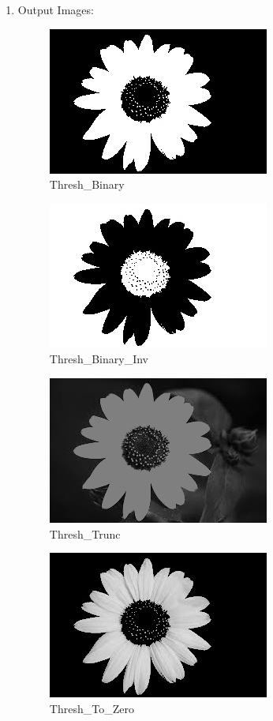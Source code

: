 \documentclass[]{article}
\begin{document}
\begin{enumerate}
\item Output Images:
	\begin{figure}[h]
		\centering
	  	\includegraphics{Threshbinary.jpg}
	  	\caption{Thresh\_Binary}
	\end{figure}

	\begin{figure}[b]
	  	\centering
	  	\includegraphics{ThreshBinaryInv.jpg}
	  	\caption{Thresh\_Binary\_Inv}
	\end{figure}

	\begin{figure}[h]
		\centering
	    \includegraphics{ThreshTrunc.jpg}
	    \caption{Thresh\_Trunc}
	\end{figure}

	\begin{figure}[b]
		\centering
	  	\includegraphics{ThreshToZero.jpg}
	  	\caption{Thresh\_To\_Zero}
	\end{figure}


\end{enumerate}
\end{document}
